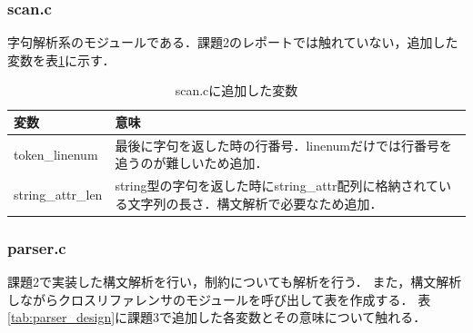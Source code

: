 \documentclass{jlreq}
\begin{document}
\subsubsection{scan.c}
字句解析系のモジュールである．課題2のレポートでは触れていない，追加した変数を表\ref{tab:scan_design}に示す．
\begin{table}[H]
  \centering
  \caption{scan.cに追加した変数}
  \begin{tabular}{|l|p{10cm}|}
    \hline
    変数              & 意味                                                                                               \\ \hline
    token\_linenum    & 最後に字句を返した時の行番号．linenumだけでは行番号を追うのが難しいため追加．                      \\
    string\_attr\_len & string型の字句を返した時にstring\_attr配列に格納されている文字列の長さ．構文解析で必要なため追加． \\ \hline
  \end{tabular}
  \label{tab:scan_design}
\end{table}

\subsubsection{parser.c}
課題2で実装した構文解析を行い，制約についても解析を行う．
また，構文解析しながらクロスリファレンサのモジュールを呼び出して表を作成する．
表\ref{tab:parser_design}に課題3で追加した各変数とその意味について触れる．
\end{document}
